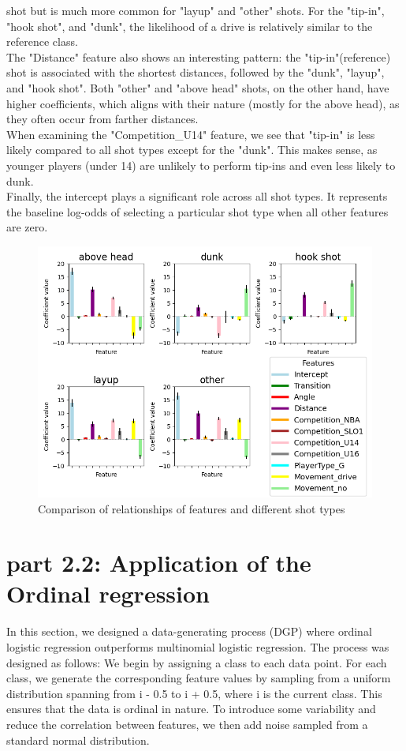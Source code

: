 \documentclass[9pt]{IEEEtran}
\begin{document}
     shot but is much more common for "layup" and "other" shots. For the "tip-in", "hook shot", 
     and "dunk", the likelihood of a drive is relatively similar to the reference class.\\
The "Distance" feature also shows an interesting pattern: the "tip-in"(reference) shot is associated with 
the shortest distances, followed by the "dunk", "layup", and "hook shot". Both "other" and 
"above head" shots, on the other hand, have higher coefficients, which aligns with their nature 
(mostly for the above head), as they often occur from farther distances.\\
When examining the "Competition\_U14" feature, we see that "tip-in" is less likely compared
 to all shot types except for the "dunk". This makes sense, as younger players (under 14) are 
 unlikely to perform tip-ins and even less likely to dunk.\\
Finally, the intercept plays a significant role across all shot types. It represents the 
baseline log-odds of selecting a particular shot type when all other features are zero. 


\begin{figure}[h]
    \centering
    \includegraphics[width=.99\columnwidth]{figures/betas.png}
    \caption{Comparison of relationships of features and different shot types}
    \label{fig:betas}
\end{figure}

\section{part 2.2: Application of the Ordinal regression}
In this section, we designed a data-generating process (DGP) where ordinal
 logistic regression outperforms multinomial logistic regression. The process
  was designed as follows: We begin by assigning a class to each data point.
   For each class, we generate the corresponding feature values by sampling 
   from a uniform distribution spanning from i - 0.5 to i + 0.5, where i is 
   the current class. This ensures that the data is ordinal in nature. To 
   introduce some variability and reduce the correlation between features,
    we then add noise sampled from a standard normal distribution.
\end{document}
